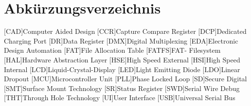 \newpage
\section*{Abkürzungsverzeichnis}
\begin{acronym}[main]
	[CAD]{Computer Aided Design}
	[CCR]{Capture Compare Register}
	[DCP]{Dedicated Charging Port}
	[DR]{Data Register}
	[DMX]{Digital Multiplexing}
	[EDA]{Electronic Design Automation}
	[FAT]{File Allocation Table}
	[FATFS]{FAT- Filesystem}
	[HAL]{Hardware Abstraction Layer}
	[HSE]{High Speed External}
	[HSI]{High Speed Internal}
	[LCD]{Liquid-Crystal-Display}
	[LED]{Light Emitting Diode}
	[LDO]{Linear Dropout}
	[MCU]{Microcontroller Unit}
	[PLL]{Phase Locked Loop}
	[SD]{Secure Digital}
	[SMT]{Surface Mount Technology}
	[SR]{Status Register}
	[SWD]{Serial Wire Debug}
	[THT]{Through Hole Technology}
	[UI]{User Interface}
	[USB]{Universal Serial Bus}
\end{acronym}